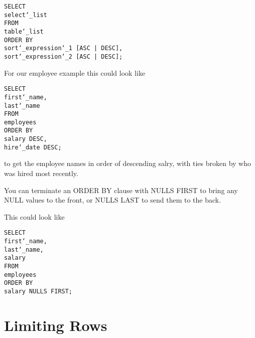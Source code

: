 \documentclass[10pt, english]{article}
\begin{document}
\texttt{SELECT\\
\hspace*{10pt}select\char`_list \\
FROM\\
\hspace*{10pt}table\char`_list \\
ORDER BY\\
\hspace*{10pt}sort\char`_expression\char`_1 [ASC | DESC],\\
\hspace*{10pt}sort\char`_expression\char`_2 [ASC | DESC];
}

For our employee example this could look like

\texttt{SELECT\\
\hspace*{10pt}first\char`_name,\\
\hspace*{10pt}last\char`_name\\
FROM\\
\hspace*{10pt}employees \\
ORDER BY\\
\hspace*{10pt}salary DESC,\\
\hspace*{10pt}hire\char`_date DESC;
}

to get the employee names in order of descending salry, with ties broken
by who was hired most recently.

You can terminate an ORDER BY clause with NULLS FIRST to bring any NULL values
to the front, or NULLS LAST to send them to the back.

This could look like

\texttt{SELECT\\
\hspace*{10pt}first\char`_name,\\
\hspace*{10pt}last\char`_name,\\
\hspace*{10pt}salary \\
FROM\\
\hspace*{10pt}employees \\
ORDER BY\\
\hspace*{10pt}salary NULLS FIRST;
}

\newpage
\section{Limiting Rows}
\end{document}
